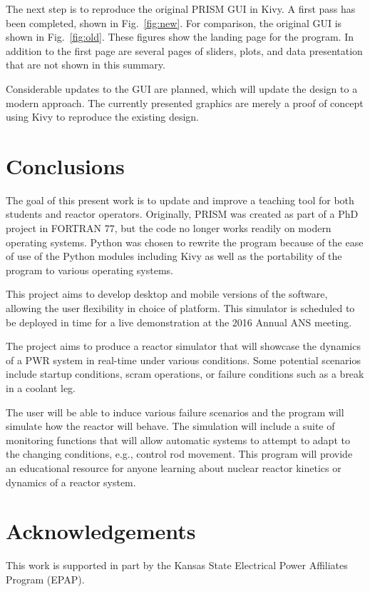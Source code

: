 \documentclass{anstrans}
\newcommand{\FIG}[1]{Fig.~\ref{#1}}               %
\begin{document}
    The next step is to reproduce the original PRISM GUI in Kivy.  A first pass has
    been completed, shown in \FIG{fig:new}.  For comparison, the original 
    GUI is shown in \FIG{fig:old}.  These figures show the landing page for the program.
    In addition to the first page are several pages of sliders, plots, and data
    presentation that are not shown in this summary.
    
    Considerable updates to the GUI are planned, which will update the design to
    a modern approach.  The currently presented graphics are merely a proof of
    concept using Kivy to reproduce the existing design.  
    
    
    \section{Conclusions}
    
    The goal of this present work is to update and improve a teaching tool for 
    both students and reactor operators.  Originally, PRISM was created as part
    of a PhD project in FORTRAN 77, but the code no longer works readily on modern 
    operating systems.  Python was chosen to rewrite the program
    because of the ease of use of the Python modules including Kivy as well as
    the portability of the program to various operating systems.
    
    This project aims to develop desktop and mobile versions of the software, 
    allowing the user flexibility in choice of platform.  This simulator is scheduled
    to be deployed in time for a live demonstration at the 2016 Annual ANS meeting.  
    
    The project aims to produce a reactor simulator that will showcase the dynamics
    of a PWR system in real-time under various conditions.  Some potential scenarios
    include startup conditions, scram operations, or failure conditions such as
    a break in a coolant leg.  
    
    The user will be able to induce various failure scenarios and the program will
    simulate how the reactor will behave.  The simulation will include a suite of 
    monitoring functions that will allow automatic systems to attempt to adapt to
    the changing conditions, e.g., control rod movement.  This program will provide
    an educational resource for anyone learning about nuclear reactor kinetics or
    dynamics of a reactor system.
    
    \section{Acknowledgements}
    
    This work is supported in part by the Kansas State Electrical Power Affiliates
    Program (EPAP).
    


    
\end{document}
